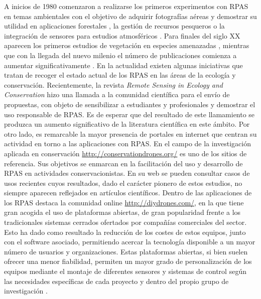 \documentclass[onecolumn]{extarticle}
\begin{document}
A inicios de 1980 comenzaron a realizarse los primeros experimentos con
RPAS en temas ambientales con el objetivo de adquirir fotografías aéreas
y demostrar su utilidad en aplicaciones forestales , la gestión de
recursos pesqueros o la integración de sensores para estudios
atmosféricos \citep{Tomlins1983}. Para finales del siglo XX aparecen los
primeros estudios de vegetación en especies amenazadas
\citep{quilter1997vegetation}, mientras que con la llegada del nuevo
milenio el número de publicaciones comienza a aumentar
significativamente \citep{Hardin2011}. En la actualidad existen algunas
iniciativas que tratan de recoger el estado actual de los RPAS en las
áreas de la ecología y conservación. Recientemente, la revista
\emph{Remote Sensing in Ecology and Conservation} hizo una llamada a la
comunidad científica para el envío de propuestas, con objeto de
sensibilizar a estudiantes y profesionales y demostrar el uso
responsable de RPAS. Es de esperar que del resultado de este llamamiento
se produzca un aumento significativo de la literatura científica en este
ámbito. Por otro lado, es remarcable la mayor presencia de portales en
internet que centran su actividad en torno a las aplicaciones con RPAS.
En el campo de la investigación aplicada en conservación
\url{http://conservationdrones.org/} es uno de los sitios de referencia.
Sus objetivos se enmarcan en la facilitación del uso y desarrollo de
RPAS en actividades conservacionistas. En su web se pueden consultar
casos de usos recientes cuyos resultados, dado el carácter pionero de
estos estudios, no siempre aparecen reflejados en artículos científicos.
Dentro de las aplicaciones de los RPAS destaca la comunidad online
\url{http://diydrones.com/}, en la que tiene gran acogida el uso de
plataformas abiertas, de gran popularidad frente a los tradicionales
sistemas cerrados ofertados por compañías comerciales del sector. Esto
ha dado como resultado la reducción de los costes de estos equipos,
junto con el software asociado, permitiendo acercar la tecnología
disponible a un mayor número de usuarios y organizaciones. Estas
plataformas abiertas, si bien suelen ofrecer una menor fiabilidad,
permiten un mayor grado de personalización de los equipos mediante el
montaje de diferentes sensores y sistemas de control según las
necesidades específicas de cada proyecto y dentro del propio grupo de
investigación \citep{Koh2012}.
\end{document}
